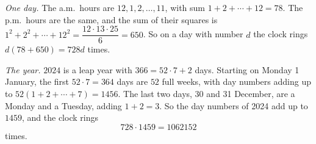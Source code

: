 \emph{One day.} The a.m.\ hours are $12,1,2,\dots,11$, with sum $1+2+\cdots+12=78$. The p.m.\ hours are the same, and the sum of their squares is $1^2+2^2+\cdots+12^2=\dfrac{12\cdot13\cdot25}{6}=650$. So on a day with number $d$ the clock rings $d(78+650)=728d$ times.

\emph{The year.} $2024$ is a leap year with $366=52\cdot7+2$ days. Starting on Monday 1 January, the first $52\cdot7=364$ days are $52$ full weeks, with day numbers adding up to $52(1+2+\cdots+7)=1456$. The last two days, 30 and 31 December, are a Monday and a Tuesday, adding $1+2=3$. So the day numbers of 2024 add up to $1459$, and the clock rings
\[728\cdot1459=\boxed{1062152}\]
times.
